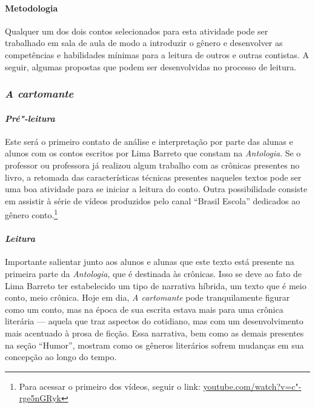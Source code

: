 \documentclass[11pt]{extarticle}
\begin{document}
{{\paragraph{Metodologia} Qualquer um dos dois contos selecionados para esta
atividade pode ser trabalhado em sala de aula de modo a introduzir o
gênero e desenvolver as competências e habilidades mínimas para a
leitura de outros e outras contistas. A seguir, algumas propostas que
podem ser desenvolvidas no processo de leitura.

\subsubsection{\textit{A cartomante}}

\paragraph{\textit{Pré"-leitura}}

Este será o primeiro contato de análise e interpretação por parte das
alunas e alunos com os contos escritos por Lima Barreto que constam na
\emph{Antologia}. Se o professor ou professora já realizou algum
trabalho com as crônicas presentes no livro, a retomada das
características técnicas presentes naqueles textos pode ser uma boa
atividade para se iniciar a leitura do conto. Outra possibilidade
consiste em assistir à série de vídeos produzidos pelo canal ``Brasil
Escola'' dedicados ao gênero conto.\footnote{Para acessar o primeiro dos
  vídeos, seguir o link:
  \href{https://www.youtube.com/watch?v=c"-rge5nGRyk}{youtube.com/watch?v=c"-rge5nGRyk}}

\paragraph{\textit{Leitura}}

Importante salientar junto aos alunos e alunas que este texto está
presente na primeira parte da \emph{Antologia}, que é destinada às
crônicas. Isso se deve ao fato de Lima Barreto ter estabelecido um tipo
de narrativa híbrida, um texto que é meio conto, meio crônica. Hoje em
dia, \textit{\emph{A cartomante}} pode tranquilamente figurar como um
conto, mas na época de sua escrita estava mais para uma crônica
literária --- aquela que traz aspectos do cotidiano, mas com um
desenvolvimento mais acentuado à prosa de ficção. Essa narrativa, bem
como as demais presentes na seção ``Humor'', mostram como os gêneros
literários sofrem mudanças em sua concepção ao longo do tempo.

}}
\end{document}
